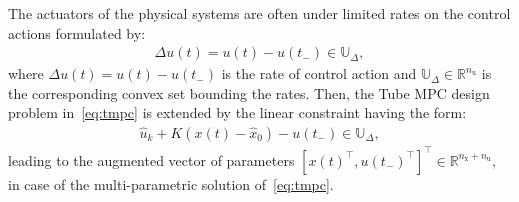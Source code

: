 \documentclass[letterpaper, 10 pt, conference]{ieeeconf}
\begin{document}
	
	The actuators of the physical systems are often under limited rates on the control actions formulated by:
	\begin{eqnarray}
		\label{eq:rate_constraints_x_u}
		\Delta u(t) = u(t) - u(t_{-}) \in \mathbb{U}_{\Delta} ,
	\end{eqnarray}
	where $\Delta u(t) = u(t) - u(t_{-})$ is the rate of control action and $\mathbb{U}_{\Delta} \in \mathbb{R}^{n_{\mathrm{u}}}$ is the corresponding convex set bounding the rates. Then, the Tube MPC design problem in~\eqref{eq:tmpc} is extended by the linear constraint having the form: 
	\begin{eqnarray}
		\label{eq:tmpc_constraints_input_delta_0}
		\hat{u}_{k} + K ( x(t) - \hat{x}_{0} ) - u(t_{-}) \in \mathbb{U}_{\Delta} , 
	\end{eqnarray}
	leading to the augmented vector of parameters $[x(t)^{\top}, u(t_{-})^{\top}]^{\top} \in \mathbb{R}^{n_{\mathrm{x}} + n_{\mathrm{u}}}$, in case of the multi-parametric solution of~\eqref{eq:tmpc}.
	
	
\end{document}
